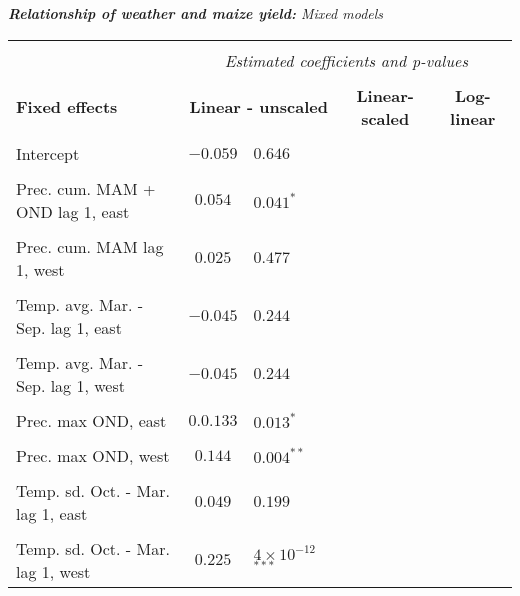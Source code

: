 \documentclass[a4paper,12pt]{article}
\begin{document}
{\centering
\begin{threeparttable}


\singlespacing
\caption{\textit{\textbf{Relationship of weather and maize yield:} Mixed models}}
 
\label{Peggy45} 
\centering
\begin{small}
\begin{tabular}{lclrlcl} 
\hline \vspace{-0.2cm} \\
  &\multicolumn{6}{c}{\textit{Estimated coefficients and p-values}}  \\
  
\vspace{-0.2cm} \\

  \multicolumn{1}{l}{\vspace{0.1cm}\textbf{Fixed effects}}  &\multicolumn{2}{c}{{\textbf{Linear - unscaled}}}& \multicolumn{2}{c}{{\textbf{Linear-scaled}}}& \multicolumn{2}{c}{{\textbf{Log-linear}}}  \\
  
 \hline 
\hline
\\
\vspace{-0.2cm}Intercept&$-0.059$& $0.646$&\\
  \\
\vspace{-0.2cm}Prec. cum. MAM + OND lag 1, east&$0.054$& $0.041^{*}$&\\
  \\
  \vspace{-0.2cm}Prec. cum. MAM lag 1, west&$0.025$& $0.477$&\\
  \\
  \vspace{-0.2cm}Temp. avg. Mar. - Sep. lag 1, east&$-0.045$& $0.244$&\\
  \\
    \vspace{-0.2cm}Temp. avg. Mar. - Sep. lag 1, west&$-0.045$& $0.244$&\\
  \\
  
      \vspace{-0.2cm}Prec. max OND, east&$0.0.133$& $0.013^{*}$&\\
  \\
        \vspace{-0.2cm}Prec. max OND, west&$0.144$& $0.004^{**}$&\\
  \\
    \vspace{-0.2cm}Temp. sd. Oct. - Mar. lag 1, east&$0.049$& $0.199$&\\
  \\
      \vspace{-0.2cm}Temp. sd. Oct. - Mar. lag 1, west&$0.225$& $4\times10^{-12}$ $^{***}$\\
      

\end{tabular}
\end{small}
\end{threeparttable}}
\end{document}
